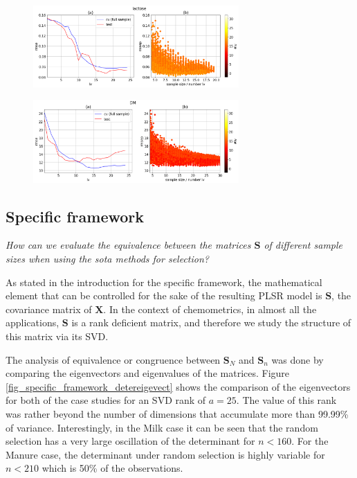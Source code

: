 \documentclass{article}
\begin{document}
\begin{figure}[b]
\includegraphics[width=0.7\textwidth]{manuscript/figures/d01_milk_general_framework.png}
\centering
\caption{}
\label{fig_d01_milk_general_framework}
\end{figure}

\begin{figure}[b]
\includegraphics[width=0.7\textwidth]{manuscript/figures/d02_manure_general_framework.png}
\centering
\caption{}
\label{fig_d02_manure_general_framework}
\end{figure}

\subsection*{Specific framework}\label{results:specframework}

\emph{How can we evaluate the equivalence between the matrices $\mathbf{S}$ of different sample sizes when using the sota methods for selection?}

As stated in the introduction for the specific framework, the mathematical element that can be controlled for the sake of the resulting PLSR model is $\mathbf{S}$, the covariance matrix of $\mathbf{X}$. In the context of chemometrics, in almost all the applications, $\mathbf{S}$ is a rank deficient matrix, and therefore we study the structure of this matrix via its SVD. 

The analysis of equivalence or congruence between $\mathbf{S}_N$ and $\mathbf{S}_n$ was done by comparing the eigenvectors and eigenvalues of the matrices. Figure \ref{fig_specific_framework_detereigevect} shows the comparison of the eigenvectors for both of the case studies for an SVD rank of $a=25$. The value of this rank was rather beyond the number of dimensions that accumulate more than 99.99\% of variance. Interestingly, in the Milk case it can be seen that the random selection has a very large oscillation of the determinant for $n<160$. For the Manure case, the determinant under random selection is highly variable for $n<210$ which is 50\% of the observations. 
\end{document}
